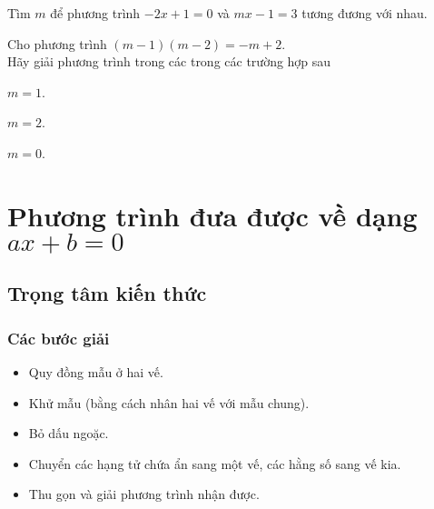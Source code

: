 \begin{bt}%
	Tìm $m$ để phương trình $-2x+1=0$ và $mx-1=3$ tương đương với nhau.
\end{bt}
\begin{bt}%
	Cho phương trình $\left(m-1\right)\left(m-2\right)=-m+2$.\\
	Hãy giải phương trình trong các trong các trường hợp sau
	\begin{enumEX}{3}
		\item $m=1$.
		\item $m=2$.
		\item $m=0$.
	\end{enumEX}
\end{bt}
\section{Phương trình đưa được về dạng $ax+b=0$}
\subsection{Trọng tâm kiến thức}
\subsubsection{Các bước giải}
	\begin{itemize}
		\item Quy đồng mẫu ở hai vế.
		\item Khử mẫu (bằng cách nhân hai vế với mẫu chung).
		\item Bỏ dấu ngoặc.
		\item Chuyển các hạng tử chứa ẩn sang một vế, các hằng số sang vế kia.
		\item Thu gọn và giải phương trình nhận được.
	\end{itemize}
